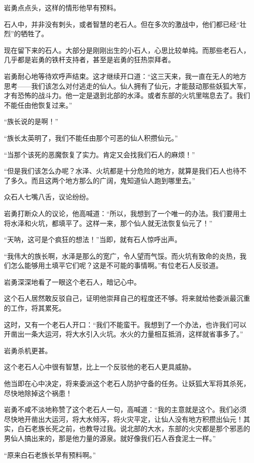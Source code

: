 \begin{this_body}
岩勇点点头，这样的情形他早有预料。

石人中，并非没有刺头，或者智慧的老石人。但在多次的激战中，他们都已经“壮烈”的牺牲了。

现在留下来的石人。大部分是刚刚出生的小石人，心思比较单纯。而那些老石人，几乎都是岩勇的铁杆支持者，甚至是岩勇的狂热崇拜者。

岩勇耐心地等待欢呼声结束。这才继续开口道：“这三天来，我一直在无人的地方思考——我们该怎么对付逃走的仙人。仙人拥有了仙元，才能鼓动那些妖狐大军，才有恐怖的战斗力。他一定是退到北部的水泽。或者东部的火坑里喘息去了。我们不能任由他恢复过来。”

“族长说的是啊！”

“族长太英明了，我们不能任由那个可恶的仙人积攒仙元。”

“当那个该死的恶魔恢复了实力。肯定又会找我们石人的麻烦！”

“但是我们该怎么办呢？水泽、火坑都是十分危险的地方，就算是我们石人也待不了多久。而且这两个地方那么的广阔，鬼知道仙人跑到哪里去。”

众石人七嘴八舌，议论纷纷。

岩勇打断众人的议论，他高喊道：“所以，我想到了一个唯一的办法。我们要用土将水泽和火坑，都填平了。这样一来，那个仙人就无法恢复仙元了！”

“天呐，这可是个疯狂的想法！”当即，就有石人惊呼出声。

“我伟大的族长啊，水泽是那么的宽广，令人望而气馁。而火坑有致命的炎热，我们怎么能够用土填平它们呢？这是不可能的事情啊。”有位老石人反驳道。

岩勇深深地看了一眼这个老石人，暗记心中。

这个石人居然敢反驳自己，证明他崇拜自己的程度还不够。将来就给他委派最沉重的工作，将其累死。

这时，又有一个老石人开口：“我们不能蛮干。我想到了一个办法，也许我们可以开凿出一条大运河，将大水引入火坑。水火的力量相互抵消，这样就省事多了。”

岩勇杀机更甚。

这个老石人心中很有智慧，比上一个反驳他的老石人更具威胁。

他当即在心中决定，将来委派这个老石人防护守备的任务。让妖狐大军将其杀死，尽快地除掉这个祸患！

岩勇不咸不淡地称赞了这个老石人一句，高喊道：“我的主意就是这个。我们必须尽快地开凿出大运河，将大水倾泻，将火灾平定，让仙人没有地方积攒出仙元！其实，白石老族长死之前，也教导过我。说北部的大水，东部的火灾都是那个邪恶的男仙人搞出来的，那是他力量的源泉。就好像我们石人吞食泥土一样。”

“原来白石老族长早有预料啊。”


\end{this_body}
